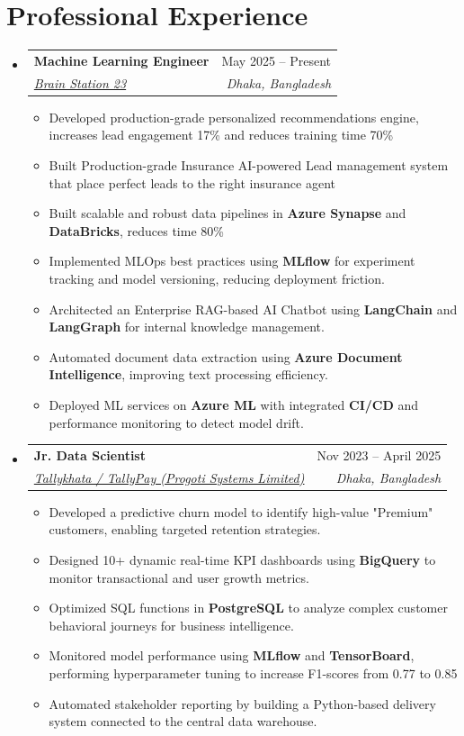 \documentclass[10pt, a4paper]{article}
\makeatletter
\newcommand{\resumeItem}[1]{
  \item\small{
    {#1 \vspace{-2pt}}
  }
}
\newcommand{\resumeSubheading}[4]{
  \vspace{-2pt}\item
    \begin{tabular*}{\linewidth}[t]{@{}l@{\extracolsep{\fill}}r@{}}
      \textbf{#1} & \small#2 \\
      \textit{\small#3} & \textit{\footnotesize #4} \\
    \end{tabular*}\vspace{-7pt}
}
\makeatother
\begin{document}
\section{Professional Experience}
  \begin{itemize}[leftmargin=0.02in, label={}]
    \resumeSubheading
      {Machine Learning Engineer}{May 2025 -- Present}
      {\href{https://brainstation-23.com}{Brain Station 23}}{Dhaka, Bangladesh}
      \begin{itemize}
        \resumeItem{Developed production-grade personalized recommendations engine, increases lead engagement 17\% and reduces training time 70\%}
        \resumeItem{Built Production-grade Insurance AI-powered Lead management system that place perfect leads to the right insurance agent}
        \resumeItem{Built scalable and robust data pipelines in \textbf{Azure Synapse} and \textbf{DataBricks}, reduces time 80\%}
        \resumeItem{Implemented MLOps best practices using \textbf{MLflow} for experiment tracking and model versioning, reducing deployment friction.}
        \resumeItem{Architected an Enterprise RAG-based AI Chatbot using \textbf{LangChain} and \textbf{LangGraph} for internal knowledge management.}
        \resumeItem{Automated document data extraction using \textbf{Azure Document Intelligence}, improving text processing efficiency.}
        \resumeItem{Deployed ML services on \textbf{Azure ML} with integrated \textbf{CI/CD} and performance monitoring to detect model drift.}
      \end{itemize}

    \resumeSubheading
      {Jr. Data Scientist}{Nov 2023 -- April 2025}
      {\href{https://www.tallykhata.com/en/home-eng/}{Tallykhata / TallyPay (Progoti Systems Limited)}}{Dhaka, Bangladesh}
      \begin{itemize}
        \resumeItem{Developed a predictive churn model to identify high-value "Premium" customers, enabling targeted retention strategies.}
        \resumeItem{Designed 10+ dynamic real-time KPI dashboards using \textbf{BigQuery} to monitor transactional and user growth metrics.}
        \resumeItem{Optimized SQL functions in \textbf{PostgreSQL} to analyze complex customer behavioral journeys for business intelligence.}
        \resumeItem{Monitored model performance using \textbf{MLflow} and \textbf{TensorBoard}, performing hyperparameter tuning to increase F1-scores from 0.77 to 0.85}
        \resumeItem{Automated stakeholder reporting by building a Python-based delivery system connected to the central data warehouse.}
      \end{itemize}


\end{itemize}
\end{document}

